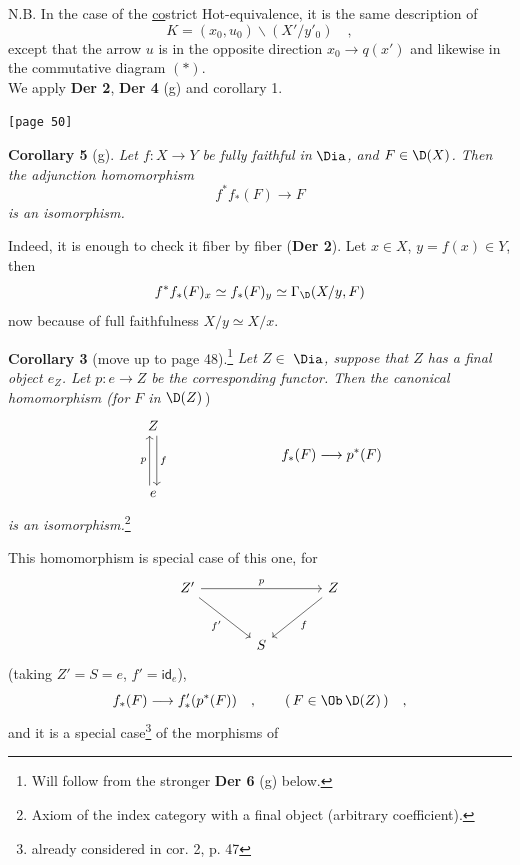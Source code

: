 
\noindent N.B. In the case of the \underline{co}strict Hot-equivalence, it is the same description of
\[ K = (x_{0}, u_{0})\backslash(X'/y'_{0}) \quad , \]
except that the arrow $u$ is in the opposite direction $x_{0} \to q(x')$ and likewise in the commutative diagram $(*)$.\\
We apply \textbf{Der 2}, \textbf{Der 4} (g) and corollary 1.

\noindent{}\texttt{[page 50]}

\noindent\textbf{Corollary 5} (g). \textit{Let $f : X \to Y$ be fully faithful in} $\Dia$\textit{, and $F \in \D(X)$. Then the adjunction homomorphism}
\[ f^{*} f_{*}(F) \longrightarrow F \]
\textit{is an isomorphism.}

Indeed, it is enough to check it fiber by fiber (\textbf{Der 2}). Let $x \in X$, $y = f(x) \in Y$, %
then
\[ f^{*} f_{*}(F)_{x} \simeq f_{*}(F)_{y} \simeq \Gamma_{\D}(X/y, F) \]
now because of full faithfulness $X/y \simeq X/x$.

\noindent\textbf{Corollary 3} (move up to page 48).\footnote[20]{Will follow from the stronger \textbf{Der 6} (g) below.} \textit{Let $Z \in$} $\Dia$\textit{, suppose that $Z$ has a final object $e_{Z}$. Let $p : e \to Z$ be the corresponding functor. Then the canonical homomorphism (for $F$ in} $\D(Z)$\,)
\[
\begin{tikzcd}[row sep=huge]
Z \arrow[d, shift left=0.6ex, "f"] \\
e \arrow[u, shift left=0.6ex, "p"]
\end{tikzcd}
\qquad\qquad\qquad\qquad
f_{*}(F) \longrightarrow p^{*}(F)
\]
\textit{is an isomorphism.}\footnote[21]{Axiom of the index category with a final object (arbitrary coefficient).}

This homomorphism is special case of this one, for
\[
\begin{tikzcd}[row sep=large, column sep=large]
Z' \arrow[rr, "p"] \arrow[dr, "f'"'] & & Z \arrow[dl, "f"] \\
& S &
\end{tikzcd}
\]
(taking $Z' = S = e$, $f' = \mathsf{id}_{e}$),
\[ f_{*}(F) \longrightarrow f'_{*}(p^{*}(F)) \quad , \qquad (\, F \in \Ob\,\D(Z)\,) \quad , \]
and it is a special case\footnote[22]{already considered in cor. 2, p. 47} of the morphisms of

